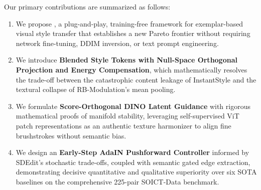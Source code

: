 Our primary contributions are summarized as follows:
\begin{enumerate}
    \item We propose \textbf{\method}, a plug-and-play, training-free framework for exemplar-based visual style transfer that establishes a new Pareto frontier without requiring network fine-tuning, DDIM inversion, or text prompt engineering.
    \item We introduce \textbf{Blended Style Tokens with Null-Space Orthogonal Projection and Energy Compensation}, which mathematically resolves the trade-off between the catastrophic content leakage of InstantStyle and the textural collapse of RB-Modulation's mean pooling.
    \item We formulate \textbf{Score-Orthogonal DINO Latent Guidance} with rigorous mathematical proofs of manifold stability, leveraging self-supervised ViT patch representations as an authentic texture harmonizer to align fine brushstrokes without semantic bias.
    \item We design an \textbf{Early-Step AdaIN Pushforward Controller} informed by SDEdit's stochastic trade-offs, coupled with semantic gated edge extraction, demonstrating decisive quantitative and qualitative superiority over six SOTA baselines on the comprehensive 225-pair SOICT-Data benchmark.
\end{enumerate}
